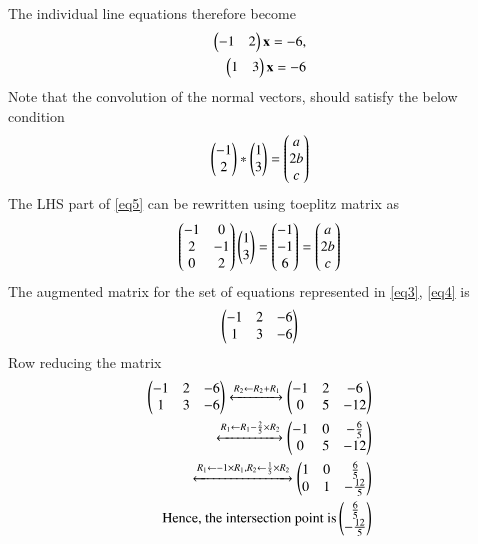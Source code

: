 \documentclass[journal,12pt,twocolumn]{IEEEtran}
\begin{document}
The individual line equations therefore become
\begin{align}
    \begin{pmatrix}-1&2\end{pmatrix}\mathbf{x}=-6\label{eq3} ,\\\begin{pmatrix}1&3\end{pmatrix}\mathbf{x}=-6\label{eq4}
\end{align}
Note that the convolution of the normal vectors, should satisfy the below condition
\begin{align}
    \begin{pmatrix}-1\\2\end{pmatrix}*\begin{pmatrix}1\\3\end{pmatrix}=\begin{pmatrix}a\\2b\\c\end{pmatrix}\label{eq5}
\end{align}
The LHS part of \eqref{eq5} can be rewritten using toeplitz matrix as
\begin{align}
    \begin{pmatrix}-1&0\\2&-1\\0&2\end{pmatrix}\begin{pmatrix}1\\3\end{pmatrix}=\begin{pmatrix}-1\\-1\\6\end{pmatrix}=\begin{pmatrix}a\\2b\\c\end{pmatrix}
\end{align}
The augmented matrix for the set of equations represented in \eqref{eq3}, \eqref{eq4} is
\begin{align}
\begin{pmatrix}-1&2&-6\\1&3&-6\end{pmatrix}
\end{align}
Row reducing the matrix
\begin{align}
 \begin{pmatrix}-1&2&-6\\1&3&-6\end{pmatrix}\xleftrightarrow[]{R_2\leftarrow R_2+R_1}\begin{pmatrix}-1&2&-6\\0&5&-12\end{pmatrix}\\
 \xleftrightarrow[]{R_1\leftarrow R_1-\frac{2}{5}\times R_2}\begin{pmatrix}-1&0&-\frac{6}{5}\\0&5&-12\end{pmatrix}\\
 \xleftrightarrow[]{R_1\leftarrow -1\times R_1  , R_2\leftarrow \frac{1}{5}\times R_2}\begin{pmatrix}1&0&\frac{6}{5}\\0&1&-\frac{12}{5}\end{pmatrix}\\
\text{Hence, the intersection point is}
\begin{pmatrix}\frac{6}{5}\\-\frac{12}{5}\end{pmatrix}
\end{align}
\end{document}
